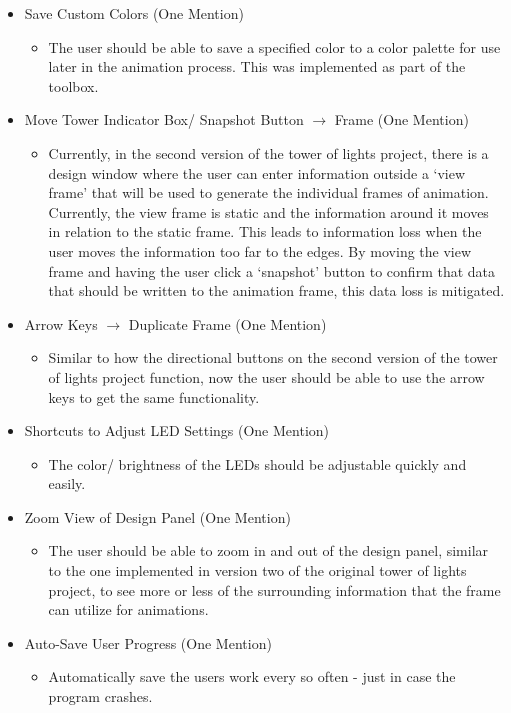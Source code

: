 \documentclass[./spec.tex]{subfiles}
\begin{document}
{\begin{itemize}
\begin{itemize}
	\end{itemize}
	\item Save Custom Colors (One Mention)
	\begin{itemize}
		\item The user should be able to save a specified color to a color palette for use later in the animation process. This was implemented as part of the toolbox.
	\end{itemize}
	\item Move Tower Indicator Box/ Snapshot Button $\rightarrow$ Frame (One Mention)
	\begin{itemize}
		\item Currently, in the second version of the tower of lights project, there is a design window where the user can enter information outside a `view frame' that will be used to generate the individual frames of animation. Currently, the view frame is static and the information around it moves in relation to the static frame. This leads to information loss when the user moves the information too far to the edges. By moving the view frame and having the user click a `snapshot' button to confirm that data that should be written to the animation frame, this data loss is mitigated.
	\end{itemize}
	\item Arrow Keys $\rightarrow$ Duplicate Frame (One Mention)
	\begin{itemize}
		\item Similar to how the directional buttons on the second version of the tower of lights project function, now the user should be able to use the arrow keys to get the same functionality.
	\end{itemize}
	\item Shortcuts to Adjust LED Settings (One Mention)
	\begin{itemize}
		\item The color/ brightness of the LEDs should be adjustable quickly and easily.
	\end{itemize}
	\item Zoom View of Design Panel (One Mention)
	\begin{itemize}
		\item The user should be able to zoom in and out of the design panel, similar to the one implemented in version two of the original tower of lights project, to see more or less of the surrounding information that the frame can utilize for animations. 
	\end{itemize}
	\item Auto-Save User Progress (One Mention)
	\begin{itemize}
		\item Automatically save the users work every so often - just in case the program crashes.
	\end{itemize}
\end{itemize}}
\end{document}
